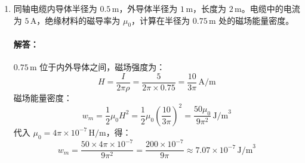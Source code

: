 \begin{enumerate}
    \paragraph{解答：}
    由安培环路定理，磁场仅沿 $\vec{e}_\theta$ 方向。
    \begin{enumerate}
        \item 内导体（$0<\rho<\rho_1$）：
        \[
        I_{\text{enclosed}} = \int_0^\rho J \cdot 2\pi\rho' d\rho' = \frac{I\rho^2}{\rho_1^2}
        \]
        \[
        H \cdot 2\pi\rho = I_{\text{enclosed}} \Rightarrow H = \frac{I\rho}{2\pi\rho_1^2}
        \]
        \[
        B = \mu_0 H = \frac{\mu_0 I \rho}{2\pi\rho_1^2}\vec{e}_\theta
        \]

        \item 内外导体之间（$\rho_1<\rho<\rho_2$）：
        包围电流为内导体全部电流 $I$，故：
        \[
        H \cdot 2\pi\rho = I \Rightarrow H = \frac{I}{2\pi\rho}
        \]
        \[
        B = \mu_0 H = \frac{\mu_0 I}{2\pi\rho}\vec{e}_\theta
        \]
    \end{enumerate}

    \item 同轴电缆内导体半径为 $0.5\,\text{m}$，外导体半径为 $1\,\text{m}$，长度为 $2\,\text{m}$。电缆中的电流为 $5\,\text{A}$，绝缘材料的磁导率为 $\mu_0$，计算在半径为 $0.75\,\text{m}$ 处的磁场能量密度。

    \paragraph{解答：}
    $0.75\,\text{m}$ 位于内外导体之间，磁场强度为：
    \[
    H = \frac{I}{2\pi\rho} = \frac{5}{2\pi \times 0.75} = \frac{10}{3\pi}\,\text{A/m}
    \]
    磁场能量密度：
    \[
    w_m = \frac{1}{2}\mu_0 H^2 = \frac{1}{2}\mu_0 \left(\frac{10}{3\pi}\right)^2 = \frac{50\mu_0}{9\pi^2}\,\text{J/m}^3
    \]
    代入 $\mu_0=4\pi\times10^{-7}\,\text{H/m}$，得：
    \[
    w_m = \frac{50 \times 4\pi\times10^{-7}}{9\pi^2} = \frac{200\times10^{-7}}{9\pi} \approx 7.07\times10^{-7}\,\text{J/m}^3
    \]
\end{enumerate}